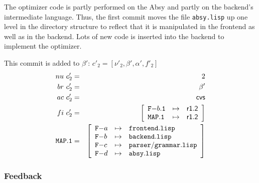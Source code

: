 \documentclass[fleqn, 10pt, a4paper]{report}
\begin{document}
The optimizer code is partly performed on the Absy and partly
on the backend's intermediate language. Thus, the first commit
moves the file \texttt{absy.lisp} up one level in the directory
structure to reflect that it is manipulated in the frontend
as well as in the backend. Lots of new code is inserted into
the backend to implement the optimizer.

This commit is added to $\beta'$: $c'_2=[\nu'_2, \beta', \alpha', f'_2]$
\begin{eqnarray*}
\mathnormal{nu}\ c'_2 &=& 2 \\
\mathnormal{br}\ c'_2 &=& \beta' \\
\mathnormal{ac}\ c'_2 &=& \mathsf{cvs} \\
\mathnormal{fi}\ c'_2 &=& \left[
\begin{array}{lcl}
\mathtt{F-}b\mathtt{.1} & \mapsto & \mathsf{r1.2} \\
\mathtt{MAP.1}         & \mapsto & \mathsf{r1.2} \\
\end{array}\right] \\
\mathtt{MAP.1} &=& \left[
\begin{array}{lcl}
\mathtt{F-}a &\mapsto& \mathtt{frontend.lisp} \\
\mathtt{F-}b &\mapsto& \mathtt{backend.lisp} \\
\mathtt{F-}c &\mapsto& \mathtt{parser/grammar.lisp} \\
\mathtt{F-}d &\mapsto& \mathtt{absy.lisp} \\
\end{array}\right]
\end{eqnarray*}

\subsubsection{Feedback}
\end{document}
